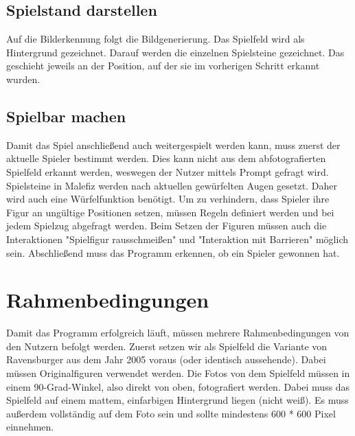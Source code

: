 \documentclass[a4paper]{article}
\begin{document}
\subsection{Spielstand darstellen}
Auf die Bilderkennung folgt die Bildgenerierung. Das Spielfeld wird als Hintergrund gezeichnet. Darauf werden die einzelnen Spielsteine gezeichnet. Das geschieht jeweils an der Position, auf der sie im vorherigen Schritt erkannt wurden.

\subsection{Spielbar machen}
Damit das Spiel anschließend auch weitergespielt werden kann, muss zuerst der aktuelle Spieler bestimmt werden. Dies kann nicht aus dem abfotografierten Spielfeld erkannt werden, weswegen der Nutzer mittels Prompt gefragt wird. Spielsteine in Malefiz werden nach aktuellen gewürfelten Augen gesetzt. Daher wird auch eine Würfelfunktion benötigt. Um zu verhindern, dass Spieler ihre Figur an ungültige Positionen setzen, müssen Regeln definiert werden und bei jedem Spielzug abgefragt werden. Beim Setzen der Figuren müssen auch die Interaktionen "Spielfigur rausschmeißen" und "Interaktion mit Barrieren" möglich sein. Abschließend muss das Programm erkennen, ob ein Spieler gewonnen hat.



\section{Rahmenbedingungen}
Damit das Programm erfolgreich läuft, müssen mehrere Rahmenbedingungen von den Nutzern befolgt werden. Zuerst setzen wir als Spielfeld die Variante von Ravensburger aus dem Jahr 2005 voraus (oder identisch aussehende). Dabei müssen Originalfiguren verwendet werden. Die Fotos von dem Spielfeld müssen in einem 90-Grad-Winkel, also direkt von oben, fotografiert werden. Dabei muss das Spielfeld auf einem mattem, einfarbigen Hintergrund liegen (nicht weiß). Es muss außerdem vollständig auf dem Foto sein und sollte mindestens 600 * 600 Pixel einnehmen.
\end{document}
